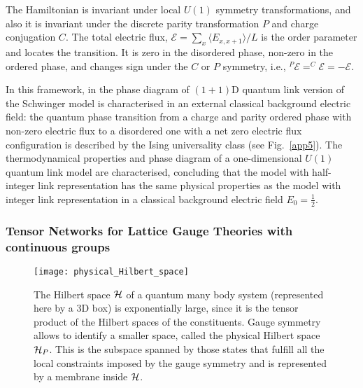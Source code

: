 \documentclass[epj,final]{svjour}
\begin{document}
The Hamiltonian is invariant under local $U(1)$ symmetry transformations, and also it is invariant under the discrete parity transformation $P$ and charge conjugation $C$. The total electric flux, $\mathcal{E}= \sum_{x} \langle E_{x,x+1} \rangle / L$ is the order parameter and locates the transition. It is zero in the disordered phase, non-zero in the ordered phase, and changes sign under the $C$ or $P$ symmetry, i.e., $^{P}\mathcal{E}=^{C}\mathcal{E}=-\mathcal{E}$.

In this framework, in \cite{rico2014tensor} the phase diagram of $(1+1)$D quantum link version of the Schwinger model is characterised in an external classical background electric field: the quantum phase transition from a charge and parity ordered phase with non-zero electric flux to a disordered one with a net zero electric flux configuration is described by the Ising universality class (see Fig.~\ref{app5}). The thermodynamical properties and phase diagram of a one-dimensional $U(1)$ quantum link model are characterised, concluding that the model with half-integer link representation has the same physical properties as the model with integer link representation in a classical background electric field $E_{0}= \frac{1}{2}$. 

\subsubsection{Tensor Networks for Lattice Gauge Theories with continuous groups\cite{tagliacozzo2014tensor}}

\begin{figure}
\begin{center}
\texttt{[image: physical\_Hilbert\_space]}
\caption{The Hilbert space ${\cal H}$ of a quantum many body system (represented here by a 3D box) is exponentially large, since it is the tensor product of the Hilbert spaces of the constituents. Gauge symmetry allows to identify a smaller space, called the physical Hilbert space ${\cal H}_P$. This is the subspace spanned by those states that fulfill all the local constraints imposed by the gauge symmetry and is represented by a membrane inside $\cal{H}$.}
\label{pHs}
\end{center}
\end{figure}
\end{document}
